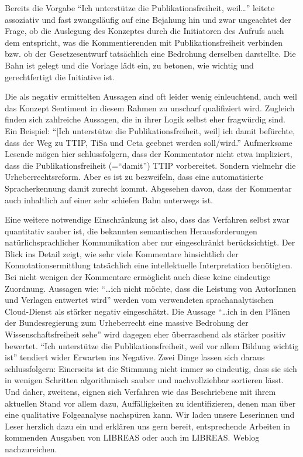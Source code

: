 \documentclass[a4paper,
fontsize=11pt,
oneside,
numbers=noperiodatend,
parskip=half-,
bibliography=totoc,
final
]{scrartcl}
\begin{document}
Bereits die Vorgabe \enquote{Ich unterstütze die Publikationsfreiheit,
weil\ldots{}} leitete assoziativ und fast zwangsläufig auf eine Bejahung
hin und zwar ungeachtet der Frage, ob die Auslegung des Konzeptes durch
die Initiatoren des Aufrufs auch dem entspricht, was die Kommentierenden
mit Publikationsfreiheit verbinden bzw. ob der Gesetzesentwurf
tatsächlich eine Bedrohung derselben darstellte. Die Bahn ist gelegt und
die Vorlage lädt ein, zu betonen, wie wichtig und gerechtfertigt die
Initiative ist.

Die als negativ ermittelten Aussagen sind oft leider wenig einleuchtend,
auch weil das Konzept Sentiment in diesem Rahmen zu unscharf
qualifiziert wird. Zugleich finden sich zahlreiche Aussagen, die in
ihrer Logik selbst eher fragwürdig sind. Ein Beispiel: \enquote{{[}Ich
unterstütze die Publikationsfreiheit, weil{]} ich damit befürchte, dass
der Weg zu TTIP, TiSa und Ceta geebnet werden soll/wird.} Aufmerksame
Lesende mögen hier schlussfolgern, dass der Kommentator nicht etwa
impliziert, dass die Publikationsfreiheit (=\enquote{damit}) TTIP
vorbereitet. Sondern vielmehr die Urheberrechtsreform. Aber es ist zu
bezweifeln, dass eine automatisierte Spracherkennung damit zurecht
kommt. Abgesehen davon, dass der Kommentar auch inhaltlich auf einer
sehr schiefen Bahn unterwegs ist.

Eine weitere notwendige Einschränkung ist also, dass das Verfahren
selbst zwar quantitativ sauber ist, die bekannten semantischen
Herausforderungen natürlichsprachlicher Kommunikation aber nur
eingeschränkt berücksichtigt. Der Blick ins Detail zeigt, wie sehr viele
Kommentare hinsichtlich der Konnotationsermittlung tatsächlich eine
intellektuelle Interpretation benötigten. Bei nicht wenigen der
Kommentare ermöglicht auch diese keine eindeutige Zuordnung. Aussagen
wie: \enquote{\ldots{}ich nicht möchte, dass die Leistung von AutorInnen
und Verlagen entwertet wird} werden vom verwendeten sprachanalytischen
Cloud-Dienst als stärker negativ eingeschätzt. Die Aussage
\enquote{\ldots{}ich in den Plänen der Bundesregierung zum Urheberrecht
eine massive Bedrohung der Wissenschaftsfreiheit sehe} wird dagegen eher
überraschend als stärker positiv bewertet. \enquote{Ich unterstütze die
Publikationsfreiheit, weil vor allem Bildung wichtig ist} tendiert wider
Erwarten ins Negative. Zwei Dinge lassen sich daraus schlussfolgern:
Einerseits ist die Stimmung nicht immer so eindeutig, dass sie sich in
wenigen Schritten algorithmisch sauber und nachvollziehbar sortieren
lässt. Und daher, zweitens, eignen sich Verfahren wie das Beschriebene
mit ihrem aktuellen Stand vor allem dazu, Auffälligkeiten zu
identifizieren, denen man über eine qualitative Folgeanalyse nachspüren
kann. Wir laden unsere Leserinnen und Leser herzlich dazu ein und
erklären uns gern bereit, entsprechende Arbeiten in kommenden Ausgaben
von LIBREAS oder auch im LIBREAS. Weblog nachzureichen.
\end{document}
